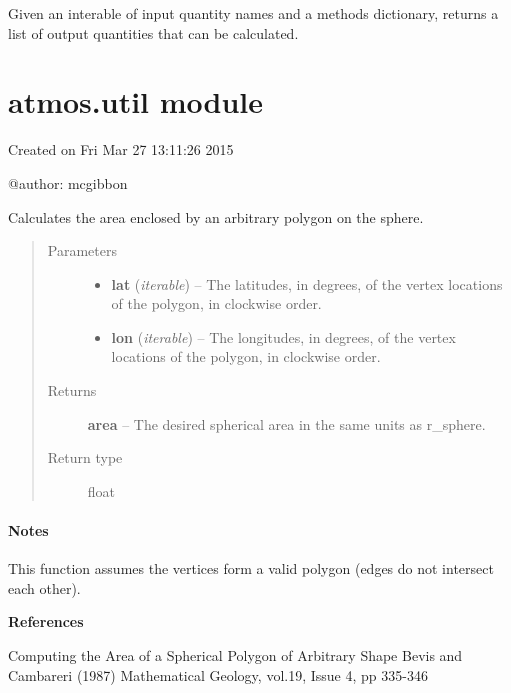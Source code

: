 \documentclass[letterpaper,10pt,english]{sphinxmanual}
\begin{document}

\begin{fulllineitems}
\label{atmos:atmos.solve.get_calculatable_quantities}
Given an interable of input quantity names and a methods dictionary,
returns a list of output quantities that can be calculated.

\end{fulllineitems}



\section{atmos.util module}
\label{atmos:module-atmos.util}\label{atmos:atmos-util-module}
Created on Fri Mar 27 13:11:26 2015

@author: mcgibbon

\begin{fulllineitems}
\label{atmos:atmos.util.area_poly_sphere}
Calculates the area enclosed by an arbitrary polygon on the sphere.
\begin{quote}\begin{description}
\item[{Parameters}] \leavevmode\begin{itemize}
\item {} 
\textbf{lat} (\emph{iterable}) -- The latitudes, in degrees, of the vertex locations of the polygon, in
clockwise order.

\item {} 
\textbf{lon} (\emph{iterable}) -- The longitudes, in degrees, of the vertex locations of the polygon, in
clockwise order.

\end{itemize}

\item[{Returns}] \leavevmode
\textbf{area} --
The desired spherical area in the same units as r\_sphere.

\item[{Return type}] \leavevmode
float

\end{description}\end{quote}
\paragraph{Notes}

This function assumes the vertices form a valid polygon (edges do not
intersect each other).

\textbf{References}

Computing the Area of a Spherical Polygon of Arbitrary Shape
Bevis and Cambareri (1987)
Mathematical Geology, vol.19, Issue 4, pp 335-346

\end{fulllineitems}
\end{document}
